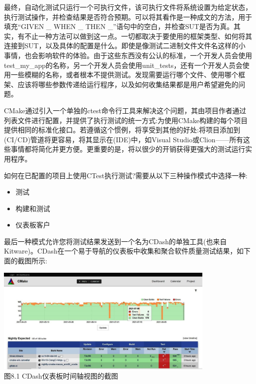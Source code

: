 
最终，自动化测试只运行一个可执行文件，该可执行文件将系统设置为给定状态，执行测试操作，并检查结果是否符合预期。可以将其看作是一种成文的方法，用于填充“GIVEN \_ WHEN \_ THEN \_”语句中的空白，并检查SUT是否为真。其实，有不止一种方法可以做到这一点。一切都取决于要使用的框架类型、如何将其连接到SUT，以及具体的配置是什么。即使是像测试二进制文件文件名这样的小事情，也会影响软件的体验。由于这些东西没有公认的标准，一个开发人员会使用test\_my\_app的名称，另一个开发人员会使用unit\_tests，还有一个开发人员会使用一些模糊的名称，或者根本不提供测试。发现需要运行哪个文件、使用哪个框架、应该将哪些参数传递给运行程序，以及如何收集结果都是用户希望避免的问题。

CMake通过引入一个单独的ctest命令行工具来解决这个问题，其由项目作者通过列表文件进行配置，并提供了执行测试的统一方式:为使用CMake构建的每个项目提供相同的标准化接口。若遵循这个惯例，将享受到其他的好处:将项目添加到(CI/CD)管道将更容易，将其显示在(IDE)中，如Visual Studio或Clion——所有这些事情都将简化并更方便。更重要的是，将以很少的开销获得更强大的测试运行实用程序。

如何在已配置的项目上使用CTest执行测试?需要从以下三种操作模式中选择一种:

\begin{itemize}
\item 
测试

\item 
构建和测试

\item 
仪表板客户
\end{itemize}

最后一种模式允许您将测试结果发送到一个名为CDash的单独工具(也来自Kitware)。CDash在一个易于导航的仪表板中收集和聚合软件质量测试结果，如下面的截图所示:

\begin{center}
\includegraphics[width=0.8\textwidth]{content/3/chapter8/images/1.jpg}\\
图8.1 CDash仪表板时间轴视图的截图
\end{center}

